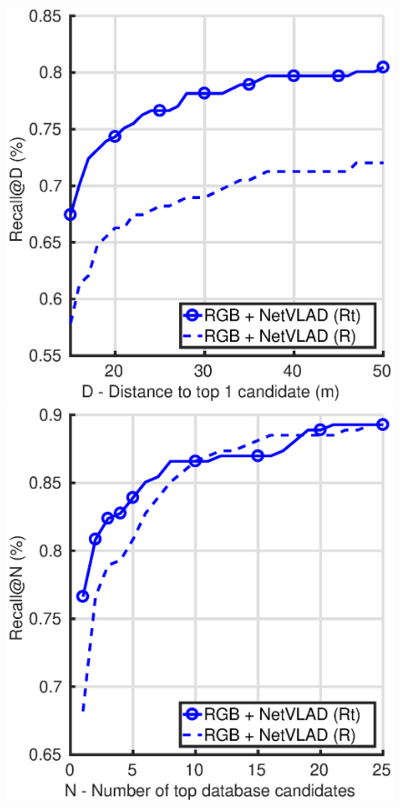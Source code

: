 \begin{figure}
	\center
	\begin{minipage}{0.49\linewidth}
		\includegraphics[width=\linewidth]{plot/fig/rgb_r_trunc_distance}	
	\end{minipage}
	\begin{minipage}{0.49\linewidth}
		\includegraphics[width=\linewidth]{plot/fig/rgb_r_trunc_recall}	

\end{minipage}
\end{figure}
